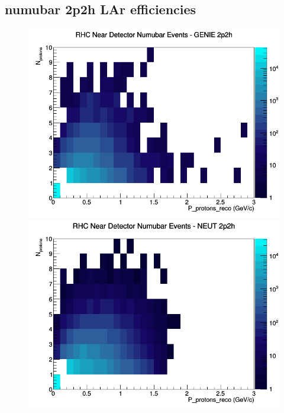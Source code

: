 \subsection{numubar 2p2h LAr efficiencies}
\begin{figure}[h]
\includegraphics[width=\linewidth]{eff_N_P/LAr/protons/2p2h_RHC_ND_numubar_N_P_GENIE.png}
\endminipage
{}
\includegraphics[width=\linewidth]{eff_N_P/LAr/protons/2p2h_RHC_ND_numubar_N_P_NEUT.png}
\endminipage
{}

\end{figure}
